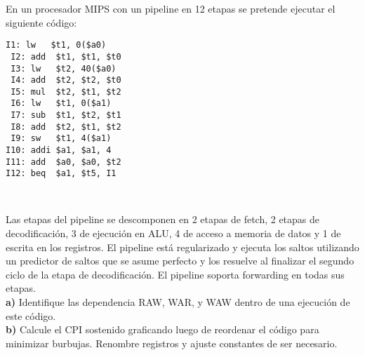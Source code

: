 \documentclass[letterpaper,11pt,notitlepage]{article}
\begin{document}
En un procesador MIPS con un pipeline en 12 etapas se pretende ejecutar el siguiente código:

\begin{lstlisting}[style=C]
 I1: lw   $t1, 0($a0)
 I2: add  $t1, $t1, $t0
 I3: lw   $t2, 40($a0)
 I4: add  $t2, $t2, $t0
 I5: mul  $t2, $t1, $t2
 I6: lw   $t1, 0($a1)
 I7: sub  $t1, $t2, $t1
 I8: add  $t2, $t1, $t2
 I9: sw   $t1, 4($a1)
I10: addi $a1, $a1, 4
I11: add  $a0, $a0, $t2
I12: beq  $a1, $t5, I1

 
\end{lstlisting}

Las etapas del pipeline se descomponen en 2 etapas de fetch, 2 etapas de decodificación, 3 de ejecución en ALU, 4 de acceso a memoria de datos y 1 de escrita en los registros. El pipeline está regularizado y ejecuta los saltos utilizando un predictor de saltos que se asume perfecto y los resuelve al finalizar el segundo ciclo de la etapa de decodificación. El pipeline soporta forwarding en todas sus etapas.
\\

\textbf{a)} Identifique las dependencia RAW, WAR, y WAW dentro de una ejecución de este código.
\\

\textbf{b)} Calcule el CPI sostenido graficando luego de reordenar el código para minimizar burbujas. Renombre registros y ajuste constantes de ser necesario.
\end{document}
